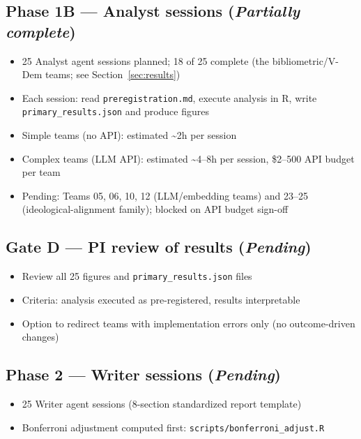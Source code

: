 \documentclass[12pt,a4paper]{article}
\begin{document}
\subsection*{Phase 1B --- Analyst sessions (\emph{Partially complete})}

\begin{itemize}
  \item 25 Analyst agent sessions planned; 18 of 25 complete (the
    bibliometric/V-Dem teams; see Section~\ref{sec:results})
  \item Each session: read \texttt{preregistration.md}, execute analysis in R,
    write \texttt{primary\_results.json} and produce figures
  \item Simple teams (no API): estimated \textasciitilde2h per session
  \item Complex teams (LLM API): estimated \textasciitilde4--8h per session,
    \$2--500 API budget per team
  \item Pending: Teams 05, 06, 10, 12 (LLM/embedding teams) and 23--25
    (ideological-alignment family); blocked on API budget sign-off
\end{itemize}

\subsection*{Gate D --- PI review of results (\emph{Pending})}

\begin{itemize}
  \item Review all 25 figures and \texttt{primary\_results.json} files
  \item Criteria: analysis executed as pre-registered, results interpretable
  \item Option to redirect teams with implementation errors only
    (no outcome-driven changes)
\end{itemize}

\subsection*{Phase 2 --- Writer sessions (\emph{Pending})}

\begin{itemize}
  \item 25 Writer agent sessions (8-section standardized report template)
  \item Bonferroni adjustment computed first: \texttt{scripts/bonferroni\_adjust.R}
\end{itemize}
\end{document}
